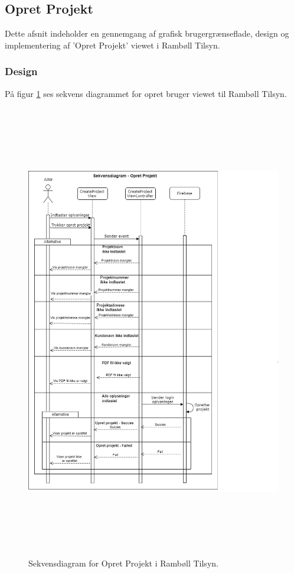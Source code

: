 \subsection{Opret Projekt}\label{sec:Opretprojekt}
Dette afsnit indeholder en gennemgang af grafisk brugergrænseflade, design og implementering af 'Opret Projekt' viewet i Rambøll Tilsyn.

\subsubsection{Design}
På figur \ref{fig:OpretProjektSekvens} ses sekvens diagrammet for opret bruger viewet til Rambøll Tilsyn.
\begin{figure}[H] %
	\centering
	\includegraphics[height=20cm, width=15cm]{../ArkitekturDesign/Design/OpretProjekt/OpretProjektSekvensDiagram}
	\caption{Sekvensdiagram for Opret Projekt i Rambøll Tilsyn.}
	\label{fig:OpretProjektSekvens}
\end{figure}

